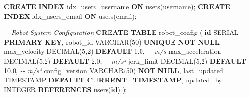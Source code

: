\documentclass[
]{article}
\newenvironment{Shaded}{\begin{snugshade}}{\end{snugshade}}
\newcommand{\CommentTok}[1]{\textcolor[rgb]{0.56,0.35,0.01}{\textit{#1}}}
\newcommand{\DataTypeTok}[1]{\textcolor[rgb]{0.13,0.29,0.53}{#1}}
\newcommand{\DecValTok}[1]{\textcolor[rgb]{0.00,0.00,0.81}{#1}}
\newcommand{\FloatTok}[1]{\textcolor[rgb]{0.00,0.00,0.81}{#1}}
\newcommand{\FunctionTok}[1]{\textcolor[rgb]{0.13,0.29,0.53}{\textbf{#1}}}
\newcommand{\KeywordTok}[1]{\textcolor[rgb]{0.13,0.29,0.53}{\textbf{#1}}}
\newcommand{\NormalTok}[1]{#1}
\begin{document}
\begin{Shaded}
\begin{Highlighting}[]
\KeywordTok{CREATE} \KeywordTok{INDEX}\NormalTok{ idx\_users\_username }\KeywordTok{ON}\NormalTok{ users(username);}
\KeywordTok{CREATE} \KeywordTok{INDEX}\NormalTok{ idx\_users\_email }\KeywordTok{ON}\NormalTok{ users(email);}

\CommentTok{{-}{-} Robot System Configuration}
\KeywordTok{CREATE} \KeywordTok{TABLE}\NormalTok{ robot\_config (}
    \KeywordTok{id}\NormalTok{ SERIAL }\KeywordTok{PRIMARY} \KeywordTok{KEY}\NormalTok{,}
\NormalTok{    robot\_id }\DataTypeTok{VARCHAR}\NormalTok{(}\DecValTok{50}\NormalTok{) }\KeywordTok{UNIQUE} \KeywordTok{NOT} \KeywordTok{NULL}\NormalTok{,}
\NormalTok{    max\_velocity }\DataTypeTok{DECIMAL}\NormalTok{(}\DecValTok{5}\NormalTok{,}\DecValTok{2}\NormalTok{) }\KeywordTok{DEFAULT} \FloatTok{1.0}\NormalTok{,  }\CommentTok{{-}{-} m/s}
\NormalTok{    max\_acceleration }\DataTypeTok{DECIMAL}\NormalTok{(}\DecValTok{5}\NormalTok{,}\DecValTok{2}\NormalTok{) }\KeywordTok{DEFAULT} \FloatTok{2.0}\NormalTok{,  }\CommentTok{{-}{-} m/s²}
\NormalTok{    jerk\_limit }\DataTypeTok{DECIMAL}\NormalTok{(}\DecValTok{5}\NormalTok{,}\DecValTok{2}\NormalTok{) }\KeywordTok{DEFAULT} \FloatTok{10.0}\NormalTok{,  }\CommentTok{{-}{-} m/s³}
\NormalTok{    config\_version }\DataTypeTok{VARCHAR}\NormalTok{(}\DecValTok{50}\NormalTok{) }\KeywordTok{NOT} \KeywordTok{NULL}\NormalTok{,}
\NormalTok{    last\_updated }\DataTypeTok{TIMESTAMP} \KeywordTok{DEFAULT} \FunctionTok{CURRENT\_TIMESTAMP}\NormalTok{,}
\NormalTok{    updated\_by }\DataTypeTok{INTEGER} \KeywordTok{REFERENCES}\NormalTok{ users(}\KeywordTok{id}\NormalTok{)}
\NormalTok{);}


\end{Highlighting}
\end{Shaded}
\end{document}
